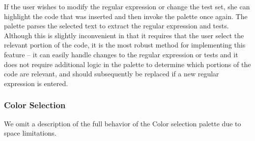 \documentclass[10pt, conference, compsocconf]{IEEEtran}
\begin{document}
If the user wishes to modify the regular expression or change the test set, she can highlight the code that was inserted and then invoke the palette once again. The palette parses the selected text to extract the regular expression and tests. Although this is slightly inconvenient in that it requires that the user select the relevant portion of the code, it is the most robust method for implementing this feature -- it can easily handle changes to the regular expression or tests and it does not require additional logic in the palette to determine which portions of the code are relevant, and should subsequently be replaced if a new regular expression is entered.

\subsubsection{Color Selection}
We omit a description of the full behavior of the Color selection palette due to space limitations. 
%
%
%
%
%
%
\end{document}
